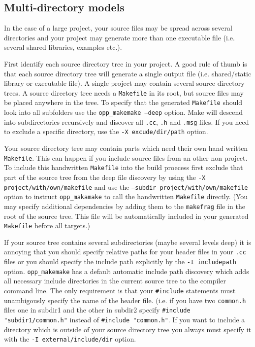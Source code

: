 \subsection{Multi-directory models}

In the case of a large project, your source files may be spread across
several directories and your project may generate more than one executable
file (i.e. several shared libraries, examples etc.). 

First identify each source directory tree in your project. A good rule of
thumb is that each source directory tree will generate a single output file
(i.e. shared/static library or executable file). A single project may contain 
several source directory trees. A source directory tree needs 
a \texttt{Makefile} in its root, but source files may be placed anywhere 
in the tree. To specify that the generated \texttt{Makefile} should look into all 
subfolders use the \texttt{opp_makemake --deep} option. Make will descend into
subdirectories recursively and discover all \texttt{.cc}, \texttt{.h} and \texttt{.msg}
files. If you need to exclude a specific directory, use the \texttt{-X excude/dir/path} 
option. 

Your source directory tree may contain parts which need their own hand written \texttt{Makefile}. 
This can happen if you include source files from an other non {\opp} project. To 
include this handwritten \texttt{Makefile} into the build proecess first exclude that part
of the source tree from the deep file discovery by using the \texttt{-X project/with/own/makefile} 
and use the \texttt{--subdir project/with/own/makefile} option to instruct \texttt{opp_makamake}
to call the handwritten \texttt{Makefile} directly. (You may specify additional dependencies by
adding them to the \texttt{makefrag} file in the root of the source tree. This file will be 
automatically included in your generated \texttt{Makefile} before all targets.)

If your source tree contains several subdirectories (maybe several levels deep) it is  
annoying that you should specify relative paths for your header files in your \texttt{.cc} files
or you should specify the include path explicitly by the \texttt{-I includepath} option. 
\texttt{opp_makemake} has a default automatic include path discovery which adds all necessary
include directories in the current source tree to the compiler command line. The only requirement is
that your \texttt{#include} statements must unambigously specify the name of the header file.
(i.e. if you have two \texttt{common.h} files one in subdir1 and the other in subdir2 specify 
\texttt{#include "subdir1/common.h"} instead of \texttt{#include "common.h"}. If you want to 
include a directory which is outside of your source directory tree you always must specify it with 
the \texttt{-I external/include/dir} option.

